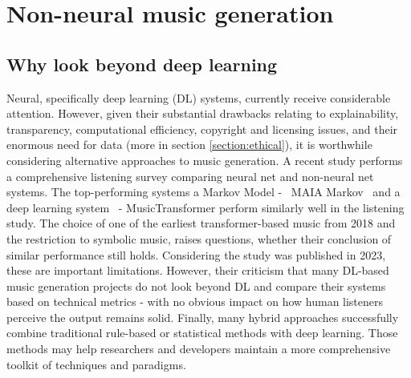 \section{Non-neural music generation} \label{section:non_neural_generation}

\subsection{Why look beyond deep learning}
Neural, specifically deep learning (DL) systems, currently receive considerable attention. However, given their substantial drawbacks relating to explainability, transparency, computational efficiency, copyright and licensing issues, and their enormous need for data (more in section \ref{section:ethical}), it is worthwhile considering alternative approaches to music generation. A recent study \cite{Yin_Reuben_Stepney_Collins_2023} performs a comprehensive listening survey comparing neural net and non-neural net systems. The top-performing systems a Markov Model -  MAIA Markov \cite{Collins_Laney_2017}  and a deep learning system  - MusicTransformer \cite{Huang_Vaswani_Uszkoreit_Shazeer_Simon_Hawthorne_Dai_Hoffman_Dinculescu_Eck_2018} perform similarly well in the listening study. The choice of one of the earliest transformer-based music from 2018 \cite{Huang_Vaswani_Uszkoreit_Shazeer_Simon_Hawthorne_Dai_Hoffman_Dinculescu_Eck_2018} and the restriction to symbolic music, raises questions, whether their conclusion of similar performance still holds. Considering the study was published in 2023, these are important limitations. However, their criticism that many DL-based music generation projects do not look beyond DL and compare their systems based on technical metrics - with no obvious impact on how human listeners perceive the output remains solid. Finally, many hybrid approaches successfully combine traditional rule-based or statistical methods with deep learning. Those methods may help researchers and developers maintain a more comprehensive toolkit of techniques and paradigms. 

